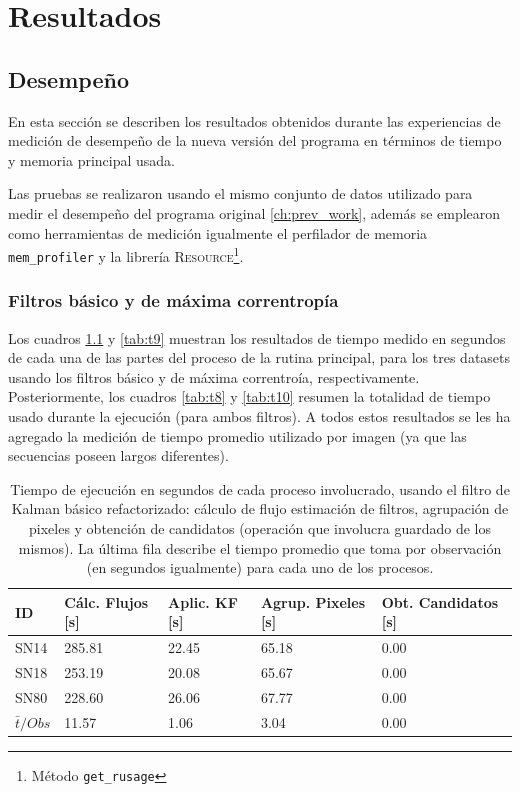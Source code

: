 \chapter{Resultados}
\label{ch:resultados}
\section{Desempe\~no}
En esta secci\'on se describen los resultados obtenidos durante las experiencias de medici\'on de desempe\~no de la nueva versi\'on del programa en t\'erminos de tiempo y memoria principal usada. 
\bigskip

Las pruebas se realizaron usando el mismo conjunto de datos utilizado para medir el desempe\~no del programa original \ref{ch:prev_work}, adem\'as se emplearon como herramientas de medici\'on igualmente el perfilador de memoria \texttt{mem\_profiler} y la librer\'ia \textsc{Resource}\footnote{M\'etodo \texttt{get\_rusage}}.

\subsection{Filtros b\'asico y de m\'axima correntrop\'ia}

Los cuadros \ref{tab:t7} y \ref{tab:t9} muestran los resultados de tiempo medido en segundos de cada una de las partes del proceso de la rutina principal, para los tres datasets usando los filtros b\'asico y de m\'axima correntro\'ia, respectivamente. Posteriormente, los cuadros \ref{tab:t8} y \ref{tab:t10} resumen la totalidad de tiempo usado durante la ejecuci\'on (para ambos filtros). A todos estos resultados se les ha agregado la medici\'on de tiempo promedio utilizado por imagen (ya que las secuencias poseen largos diferentes). 

\begin{table}[h!]
\centering
\begin{tabular}{|l|l|l|l|l|}
\hline
\textbf{ID} & \textbf{C\'alc. Flujos [s]} & \textbf{Aplic. KF [s]} &  \textbf{Agrup. Pixeles [s]}  & \textbf{Obt. Candidatos [s]}\\ \hline \hline
SN14        & 285.81            & 22.45        &  65.18 & 0.00 \\ \hline
SN18            & 253.19             & 20.08         &  65.67  & 0.00\\ \hline
SN80            & 228.60             & 26.06         &   67.77 & 0.00 \\ \hline \hline
$\bar{t}/Obs$ & 11.57 &  1.06 & 3.04 & 0.00\\\hline 
\end{tabular}
\caption{Tiempo de ejecuci\'on en segundos de cada proceso involucrado, usando el filtro de Kalman b\'asico refactorizado: c\'alculo de flujo estimaci\'on de filtros, agrupaci\'on de pixeles y obtenci\'on de candidatos (operaci\'on que involucra guardado de los mismos). La \'ultima fila describe el tiempo promedio que toma por observaci\'on (en segundos igualmente) para cada uno de los procesos. }
\label{tab:t7}
\end{table}


